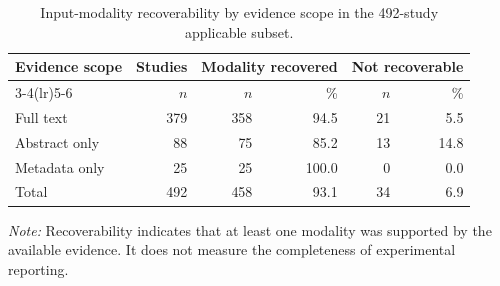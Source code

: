 \begin{table}[!t]
\centering
\caption{Input-modality recoverability by evidence scope in the 492-study applicable subset.}
\label{tab:section6-evidence-scope}
\small
\begin{tabular}{lrrrrr}
\toprule
Evidence scope & Studies & \multicolumn{2}{c}{Modality recovered} & \multicolumn{2}{c}{Not recoverable} \\
\cmidrule(lr){3-4}\cmidrule(lr){5-6}
 & $n$ & $n$ & \% & $n$ & \% \\
\midrule
Full text & 379 & 358 & 94.5 & 21 & 5.5 \\
Abstract only & 88 & 75 & 85.2 & 13 & 14.8 \\
Metadata only & 25 & 25 & 100.0 & 0 & 0.0 \\
Total & 492 & 458 & 93.1 & 34 & 6.9 \\
\bottomrule
\end{tabular}
\begin{minipage}{0.96\linewidth}\footnotesize \textit{Note:} Recoverability indicates that at least one modality was supported by the available evidence. It does not measure the completeness of experimental reporting.\end{minipage}
\end{table}
